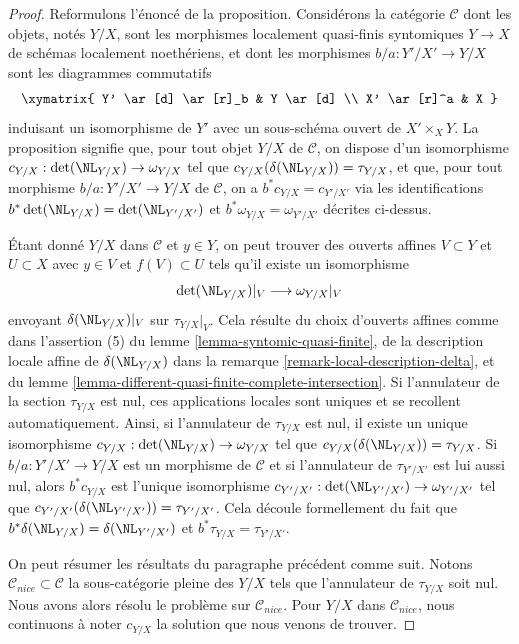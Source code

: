 \begin{proof}
Reformulons l'énoncé de la proposition. Considérons la catégorie
$\mathcal{C}$ dont les objets, notés $Y/X$, sont les morphismes localement quasi-finis syntomiques
$Y \to X$ de schémas localement noethériens, et dont les morphismes
$b/a : Y'/X' \to Y/X$ sont les diagrammes commutatifs
$$
\xymatrix{
Y' \ar[d] \ar[r]_b & Y \ar[d] \\
X' \ar[r]^a & X
}
$$
induisant un isomorphisme de $Y'$ avec un sous-schéma ouvert de
$X' \times_X Y$. La proposition signifie que, pour tout objet
$Y/X$ de $\mathcal{C}$, on dispose d'un isomorphisme
$c_{Y/X} : \det(\NL_{Y/X}) \to \omega_{Y/X}$
tel que $c_{Y/X}(\delta(\NL_{Y/X})) = \tau_{Y/X}$,
et que, pour tout morphisme $b/a : Y'/X' \to Y/X$ de $\mathcal{C}$, on a
$b^*c_{Y/X} = c_{Y'/X'}$ via les identifications
$b^*\det(\NL_{Y/X}) = \det(\NL_{Y'/X'})$ et
$b^*\omega_{Y/X} = \omega_{Y'/X'}$ décrites ci-dessus.

\medskip\noindent
Étant donné $Y/X$ dans $\mathcal{C}$ et $y \in Y$, on peut trouver
des ouverts affines $V \subset Y$ et $U \subset X$ avec
$y \in V$ et $f(V) \subset U$
tels qu'il existe un isomorphisme
$$
\det(\NL_{Y/X})|_V \longrightarrow \omega_{Y/X}|_V
$$
envoyant $\delta(\NL_{Y/X})|_V$ sur $\tau_{Y/X}|_V$. Cela résulte
du choix d'ouverts affines comme dans
l'assertion (5) du lemme \ref{lemma-syntomic-quasi-finite}, de la description
locale affine de $\delta(\NL_{Y/X})$ dans la
remarque \ref{remark-local-description-delta}, et du
lemme \ref{lemma-different-quasi-finite-complete-intersection}.
Si l'annulateur de la section $\tau_{Y/X}$ est nul, ces
applications locales sont uniques et se recollent automatiquement. Ainsi, si l'annulateur
de $\tau_{Y/X}$ est nul, il existe un unique isomorphisme
$c_{Y/X} : \det(\NL_{Y/X}) \to \omega_{Y/X}$ tel que
$c_{Y/X}(\delta(\NL_{Y/X})) = \tau_{Y/X}$.
Si $b/a : Y'/X' \to Y/X$ est un morphisme de $\mathcal{C}$
et si l'annulateur de $\tau_{Y'/X'}$ est lui aussi nul,
alors $b^*c_{Y/X}$ est l'unique isomorphisme
$c_{Y'/X'} : \det(\NL_{Y'/X'}) \to \omega_{Y'/X'}$ tel que
$c_{Y'/X'}(\delta(\NL_{Y'/X'})) = \tau_{Y'/X'}$.
Cela découle formellement du fait que
$b^*\delta(\NL_{Y/X}) = \delta(\NL_{Y'/X'})$ et
$b^*\tau_{Y/X} = \tau_{Y'/X'}$.

\medskip\noindent
On peut résumer les résultats du paragraphe précédent comme suit.
Notons $\mathcal{C}_{nice} \subset \mathcal{C}$ la
sous-catégorie pleine des $Y/X$ tels que l'annulateur de
$\tau_{Y/X}$ soit nul. Nous avons alors résolu le problème
sur $\mathcal{C}_{nice}$. Pour $Y/X$ dans $\mathcal{C}_{nice}$,
nous continuons à noter $c_{Y/X}$ la solution que nous venons de trouver.


\end{proof}
